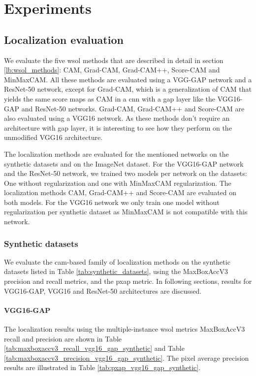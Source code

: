 \chapter{Experiments} \label{ch:experiments}

\section{Localization evaluation}
We evaluate the five \acrshort{wsol} methods that are described in detail in section \ref{lb:wsol_methods}: CAM, Grad-CAM, Grad-CAM++, Score-CAM and MinMaxCAM. All these methods are evaluated using a VGG-GAP network and a ResNet-50 network, except for Grad-CAM, which is a generalization of CAM that yields the same score maps as CAM in a \acrshort{cnn} with a \acrshort{gap} layer like the VGG16-GAP and ResNet-50 networks. Grad-CAM, Grad-CAM++ and Score-CAM are also evaluated using a VGG16 network. As these methods don't require an architecture with \acrshort{gap} layer, it is interesting to see how they perform on the unmodified VGG16 architecture.

The localization methods are evaluated for the mentioned networks on the synthetic datasets and on the ImageNet dataset. For the VGG16-GAP network and the ResNet-50 network, we trained two models per network on the datasets: One without regularization and one with MinMaxCAM regularization. The localization methods CAM, Grad-CAM++ and Score-CAM are evaluated on both models. For the VGG16 network we only train one model without regularization per synthetic dataset as MinMaxCAM is not compatible with this network. 

\subsection{Synthetic datasets}
We evaluate the \acrshort{cam}-based family of localization methods on the synthetic datasets listed in Table \ref{tab:synthetic_datasets}, using the MaxBoxAccV3 precision and recall metrics, and the \acrshort{pxap} metric. In following sections, results for VGG16-GAP, VGG16 and ResNet-50 architectures are discussed.

\subsubsection{VGG16-GAP}
The localization results using the multiple-instance \acrshort{wsol} metrics MaxBoxAccV3 recall and precision are shown in Table \ref{tab:maxboxaccv3_recall_vgg16_gap_synthetic} and Table \ref{tab:maxboxaccv3_precision_vgg16_gap_synthetic}. The pixel average precision results are illustrated in Table \ref{tab:pxap_vgg16_gap_synthetic}. 

